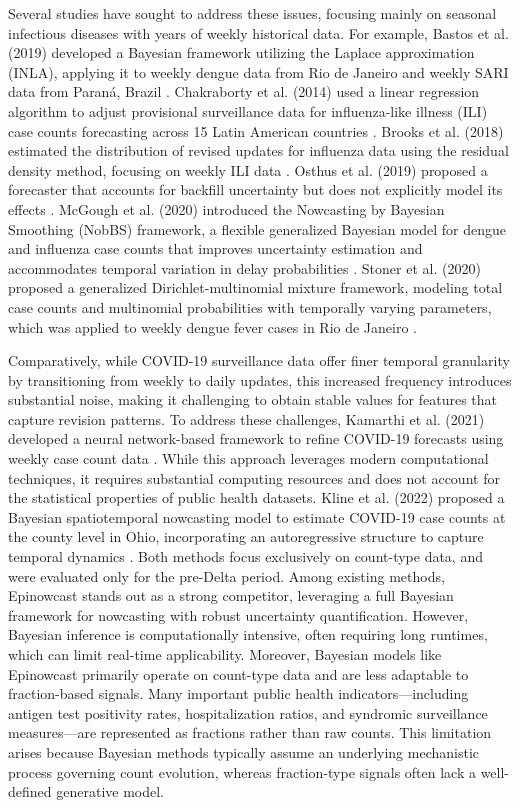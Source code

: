 Several studies have sought to address these issues, focusing mainly on seasonal infectious diseases with years of weekly historical data. For example, Bastos et al. (2019) developed a Bayesian framework utilizing the Laplace approximation (INLA), applying it to weekly dengue data from Rio de Janeiro and weekly SARI data from Paraná, Brazil \cite{bastos2019modelling}. Chakraborty et al. (2014) used a linear regression algorithm to adjust provisional surveillance data for influenza-like illness (ILI) case counts forecasting across 15 Latin American countries \cite{chakraborty2014forecasting}. Brooks et al. (2018) estimated the distribution of revised updates for influenza data using the residual density method, focusing on weekly ILI data \cite{brooks2018nonmechanistic}. Osthus et al. (2019) proposed a forecaster that accounts for backfill uncertainty but does not explicitly model its effects \cite{osthus2019even}. McGough et al. (2020) introduced the Nowcasting by Bayesian Smoothing (NobBS) framework, a flexible generalized Bayesian model for dengue and influenza case counts that improves uncertainty estimation and accommodates temporal variation in delay probabilities \cite{McGough2020}. Stoner et al. (2020) proposed a generalized Dirichlet-multinomial mixture framework, modeling total case counts and multinomial probabilities with temporally varying parameters, which was applied to weekly dengue fever cases in Rio de Janeiro \cite{stoner2020multivariate}.

Comparatively, while COVID-19 surveillance data offer finer temporal granularity by transitioning from weekly to daily updates, this increased frequency introduces substantial noise, making it challenging to obtain stable values for features that capture revision patterns. To address these challenges, Kamarthi et al. (2021) developed a neural network-based framework to refine COVID-19 forecasts using weekly case count data \cite{kamarthi2021back2future}. While this approach leverages modern computational techniques, it requires substantial computing resources and does not account for the statistical properties of public health datasets. Kline et al. (2022) proposed a Bayesian spatiotemporal nowcasting model to estimate COVID-19 case counts at the county level in Ohio, incorporating an autoregressive structure to capture temporal dynamics \cite{kline2022bayesian}. Both methods focus exclusively on count-type data, and were evaluated only for the pre-Delta period. Among existing methods, Epinowcast\cite{epinowcast} stands out as a strong competitor, leveraging a full Bayesian framework for nowcasting with robust uncertainty quantification. However, Bayesian inference is computationally intensive, often requiring long runtimes, which can limit real-time applicability. Moreover, Bayesian models like Epinowcast primarily operate on count-type data and are less adaptable to fraction-based signals. Many important public health indicators—including antigen test positivity rates, hospitalization ratios, and syndromic surveillance measures—are represented as fractions rather than raw counts. This limitation arises because Bayesian methods typically assume an underlying mechanistic process governing count evolution, whereas fraction-type signals often lack a well-defined generative model. 
 
